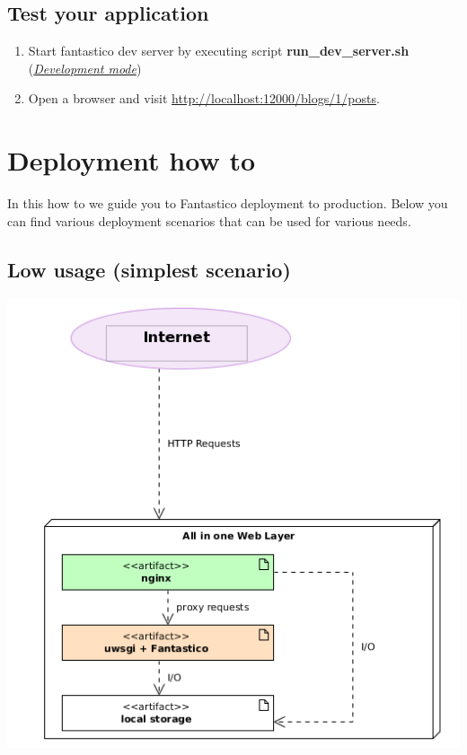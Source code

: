 \documentclass[letterpaper,10pt,english]{sphinxmanual}
\begin{document}
\subsection{Test your application}
\label{how_to/mvc_how_to:test-your-application}\begin{enumerate}
\item {} 
Start fantastico dev server by executing script \textbf{run\_dev\_server.sh} ({\hyperref[get_started/dev_mode::doc]{\emph{Development mode}}})

\item {} 
Open a browser and visit \href{http://localhost:12000/blogs/1/posts}{http://localhost:12000/blogs/1/posts}.

\end{enumerate}


\section{Deployment how to}
\label{how_to/deployment_how_to::doc}\label{how_to/deployment_how_to:deployment-how-to}
In this how to we guide you to Fantastico deployment to production. Below you can find various deployment scenarios
that can be used for various needs.


\subsection{Low usage (simplest scenario)}
\label{how_to/deployment/low_usage_scenario::doc}\label{how_to/deployment/low_usage_scenario:low-usage-simplest-scenario}
\includegraphics{low_usage_all_in_one.png}
\end{document}
